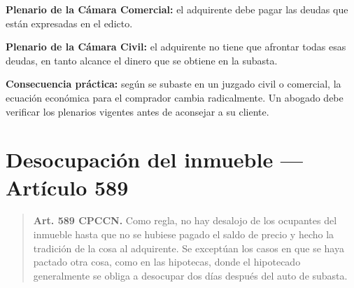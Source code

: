 \documentclass[12pt,oneside]{book}
\begin{document}
\begin{important}
\textbf{Plenario de la Cámara Comercial:} el adquirente debe pagar las deudas que están expresadas en el edicto.

\textbf{Plenario de la Cámara Civil:} el adquirente no tiene que afrontar todas esas deudas, en tanto alcance el dinero que se obtiene en la subasta.

\textbf{Consecuencia práctica:} según se subaste en un juzgado civil o comercial, la ecuación económica para el comprador cambia radicalmente. Un abogado debe verificar los plenarios vigentes antes de aconsejar a su cliente.
\end{important}

\section{Desocupación del inmueble --- Artículo 589}

\begin{quote}
\textbf{Art. 589 CPCCN.} Como regla, no hay desalojo de los ocupantes del inmueble hasta que no se hubiese pagado el saldo de precio y hecho la tradición de la cosa al adquirente. Se exceptúan los casos en que se haya pactado otra cosa, como en las hipotecas, donde el hipotecado generalmente se obliga a desocupar dos días después del auto de subasta.
\end{quote}
\end{document}
